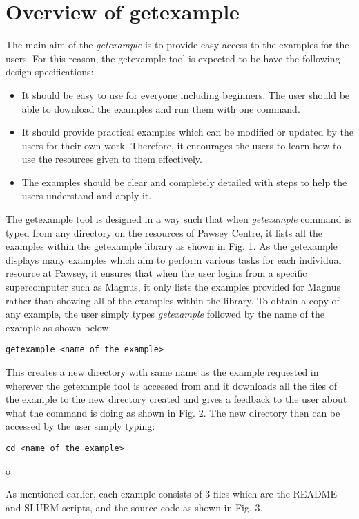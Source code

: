 
\section{Overview of getexample}

The main aim of the \emph{getexample} is to provide easy access to the examples for the users. For this reason, the getexample tool is expected to be 
have the following design specifications:

\begin{itemize}
\item It should be easy to use for everyone including beginners. The user should be able to download the examples and run them with one command.
\item It should provide practical examples which can be modified or updated by the users for their own work. Therefore, it encourages the users to learn
how to use the resources given to them effectively.
\item The examples should be clear and completely detailed with steps to help the users understand and apply it.
\end{itemize}

The getexample tool is designed in a way such that when \emph{getexample} command is typed from any directory on the resources of Pawsey Centre, it 
lists all the examples within the getexample library as shown in Fig. 1. As the getexample displays many examples which aim to perform various tasks 
for each individual resource at Pawsey, it ensures that when the user logins from a specific supercomputer such as Magnus, it only lists the examples 
provided for Magnus rather than showing all of the examples within the library. To obtain a copy of any example, the user simply types \emph{getexample} 
followed by the name of the example as shown below:

\begin{tcolorbox}
\begin{Verbatim}[fontsize=\scriptsize]
getexample <name of the example>
\end{Verbatim}
\end{tcolorbox}

This creates a new directory with same name as the example requested in wherever the getexample tool is accessed from and it downloads all the files of
the example to the new directory created and gives a feedback to the user about what the command is doing as shown in Fig. 2. The new directory then can 
be accessed by the user simply typing:

\begin{tcolorbox}
\begin{Verbatim}[fontsize=\scriptsize]
cd <name of the example>
\end{Verbatim}
\end{tcolorbox}o

As mentioned earlier, each example consists of 3 files which are the README and SLURM scripts, and the source code as shown in Fig. 3.
